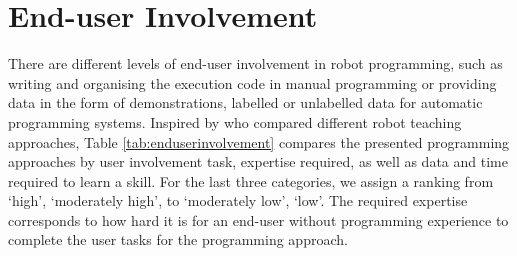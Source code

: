 



\section{End-user Involvement}\label{sssec:End-User Involvement}
There are different levels of end-user involvement in robot programming, such as writing and organising the execution code in manual programming or providing data in the form of demonstrations, labelled or unlabelled data for automatic programming systems. %
Inspired by \cite{kormushev2013reinforcement} who compared different robot teaching approaches,
Table \ref{tab:enduserinvolvement} compares the presented programming approaches by user involvement task, expertise required, as well as data and time required to learn a skill.
For the last three categories, we assign a ranking from `high', `moderately high', to `moderately low', `low'.
The required expertise corresponds to how hard it is for an end-user without programming experience to complete the user tasks for the programming approach.

